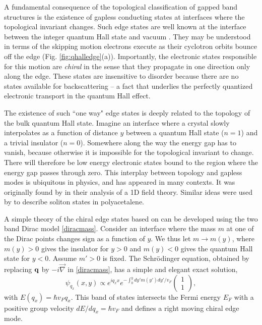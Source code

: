\documentclass[twocolumn,floatfix,showpacs,rmp,aps]{revtex4}
\begin{document}
	A fundamental consequence of the topological classification of gapped
	band structures is the existence of gapless conducting states at
	interfaces where the topological invariant changes.  Such edge states
	are well known at the interface between the integer quantum Hall
	state and vacuum \cite{halperin82}.  They may be understood in terms of the
	skipping motion electrons execute as their
	cyclotron orbits bounce off the edge (Fig. \ref{fig:qhalledge}(a)).
	Importantly, the electronic
	states responsible for this motion are {\it chiral} in the sense that
	they propagate in one direction only along the edge.  These states
	are insensitive to disorder because there are no states available for
	backscattering -- a fact that underlies the perfectly
	quantized electronic transport in the quantum Hall effect.
	
	The existence
	of such ``one way" edge states is deeply related to the topology of
	the bulk quantum Hall state.
	Imagine an interface where a crystal slowly interpolates as a
	function of distance $y$
	between a quantum Hall state ($n=1$) and a trivial insulator
	($n=0$).  Somewhere along the way the energy gap has to vanish,
	because otherwise it is impossible for the topological invariant to
	change.  There will therefore be low energy electronic states bound
	to the region where the energy gap passes through zero.  This interplay
	between topology and gapless modes is
	ubiquitous in physics, and has appeared in many contexts.
	It was originally found by \textcite{jackiw76} in their analysis of
	a 1D field theory.  Similar ideas were used by
	\textcite{su79} to describe soliton states in polyacetalene.
	
	A simple theory of the chiral edge states based on \textcite{jackiw76}
	can be developed using the
	two band Dirac model \eqref{diracmass}.  Consider an interface where
	the mass $m$ at one of the Dirac points changes sign as a function of $y$.
	We thus let $m \rightarrow m(y)$, where $m(y)>0$ gives the
	insulator for $y>0$ and $m(y)<0$ gives the quantum Hall state for $y<0$.
	Assume $m'>0$ is fixed.  The
	Schr\"odinger equation, obtained by replacing ${\bf q}$ by
	$-i \vec\nabla$ in \eqref{diracmass}, has a simple and elegant exact
	solution,
	\begin{equation}
		\psi_{q_x}(x,y) \propto e^{i q_x x} e^{-\int_0^y dy' m(y') dy'/v_F}
		\left(\begin{array}{c} 1\\1 \end{array}\right),
		\label{jackiwrebbi}
	\end{equation}
	with $E(q_x) = \hbar v_F q_x$.  This band of states intersects the
	Fermi energy $E_F$ with a positive group velocity $dE/dq_x = \hbar
	v_F$ and defines a right moving chiral edge mode.
	
\end{document}
